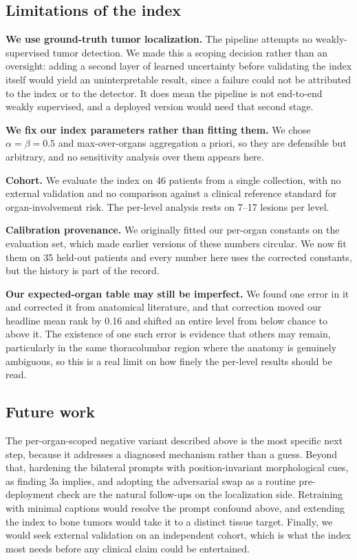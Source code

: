 \subsection{Limitations of the index}

\textbf{We use ground-truth tumor localization.} The pipeline attempts no
weakly-supervised tumor detection. We made this a scoping decision rather than
an oversight: adding a second layer of learned uncertainty before validating the
index itself would yield an uninterpretable result, since a failure could not be
attributed to the index or to the detector. It does mean the pipeline is not
end-to-end weakly supervised, and a deployed version would need that second
stage.

\textbf{We fix our index parameters rather than fitting them.} We chose
$\alpha = \beta = 0.5$ and max-over-organs aggregation a priori, so they are
defensible but arbitrary, and no sensitivity analysis over them appears here.

\textbf{Cohort.} We evaluate the index on 46 patients from a single collection,
with no external validation and no comparison against a clinical reference
standard for organ-involvement risk. The per-level analysis rests on 7--17
lesions per level.

\textbf{Calibration provenance.} We originally fitted our per-organ constants on
the evaluation set, which made earlier versions of these numbers circular. We
now fit them on 35 held-out patients and every number here uses the corrected
constants, but the history is part of the record.

\textbf{Our expected-organ table may still be imperfect.} We found one error in
it and corrected it from anatomical literature, and that correction moved our
headline mean rank by 0.16 and shifted an entire level from below chance to
above it. The existence of one such error is evidence that others may remain,
particularly in the same thoracolumbar region where the anatomy is genuinely
ambiguous, so this is a real limit on how finely the per-level results should be
read.

\subsection{Future work}

The per-organ-scoped negative variant described above is the most specific next
step, because it addresses a diagnosed mechanism rather than a guess. Beyond
that, hardening the bilateral prompts with position-invariant morphological
cues, as finding 3a implies, and adopting the adversarial swap as a routine
pre-deployment check are the natural follow-ups on the localization side.
Retraining with minimal captions would resolve the prompt confound above, and
extending the index to bone tumors would take it to a distinct tissue target.
Finally, we would seek external validation on an independent cohort, which is
what the index most needs before any clinical claim could be entertained.
